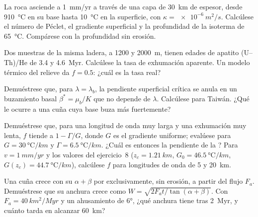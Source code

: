 \begin{exercise}[$\star\star$]\label{exo:b3:orogenic-wedges:8}
La roca asciende a \qty{1}{mm/yr} a través de una capa de \qty{30}{km} de espesor, desde
\qty{910}{\celsius} en su base hasta \qty{10}{\celsius} en la superficie, con
$\kappa = \qty{e-6}{m^2/s}$. Calcúlese el número de Péclet, el gradiente superficial y
la profundidad de la isoterma de \qty{65}{\celsius}. Compárese con la profundidad
sin erosión.
\end{exercise}

\begin{exercise}[$\star\star$]\label{exo:b3:orogenic-wedges:9}
Dos muestras de la misma ladera, a 1200 y \qty{2000}{m}, tienen edades de
apatito (U--Th)/He de 3.4 y \qty{4.6}{Myr}. Calcúlese la tasa de exhumación aparente.
Un modelo térmico del relieve da $f = 0.5$: ¿cuál es la tasa real?
\end{exercise}

\begin{exercise}[$\star\star\star$]\label{exo:b3:orogenic-wedges:10}
Demuéstrese que, para $\lambda = \lambda_b$, la pendiente superficial crítica se anula en un
buzamiento basal $\beta^* = \mu_b/K$ que no depende de $\lambda$. Calcúlese para
Taiwán. ¿Qué le ocurre a una cuña cuya base buza más fuertemente?
\end{exercise}

\begin{exercise}[$\star\star\star$]\label{exo:b3:orogenic-wedges:11}
Demuéstrese que, para una longitud de onda muy larga y una exhumación muy lenta, $f$ tiende a
$1 - \Gamma/G$, donde $G$ es el gradiente uniforme; evalúese para $G =
\qty{30}{\celsius/km}$ y $\Gamma = \qty{6.5}{\celsius/km}$. ¿Cuál es entonces la
pendiente de la ? Para $v = \qty{1}{mm/yr}$ y los
valores del ejercicio~8 ($z_c = \qty{1.21}{km}$, $G_0 = \qty{46.5}{\celsius/km}$,
$G(z_c) = \qty{44.7}{\celsius/km}$), calcúlese $f$ para longitudes de onda de 5 y
\qty{20}{km}.
\end{exercise}

\begin{exercise}[$\star\star\star$]\label{exo:b3:orogenic-wedges:12}
Una cuña crece con su  $\alpha + \beta$ por 
exclusivamente, sin erosión, a partir del flujo $F_a$. Demuéstrese que su anchura crece como
$W = \sqrt{2F_at/\tan(\alpha + \beta)}$. Con $F_a = \qty{40}{km^2/Myr}$ y
un ahusamiento de \ang{6}, ¿qué anchura tiene tras \qty{2}{Myr}, y cuánto tarda en
alcanzar \qty{60}{km}?
\end{exercise}

